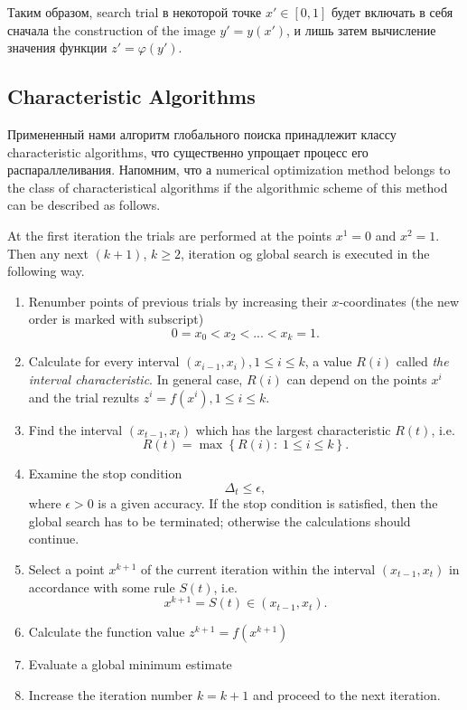 \documentclass{svproc}
\begin{document}
Таким образом, search trial в некоторой точке $x'\in[0,1]$ будет включать в себя сначала the construction of the image $y'=y(x')$, и лишь затем вычисление значения функции $ z' = \varphi(y')$.

\subsection{Characteristic Algorithms}

Примененный нами алгоритм глобального поиска принадлежит классу characteristic algorithms, что существенно упрощает процесс его распараллеливания.
Напомним, что а numerical optimization method belongs to the class of characteristical algorithms if the algorithmic scheme of this method can be described as follows.

At the first iteration the trials are performed at the points $x^1 = 0$ and $x^2 = 1$. Then any next $(k+1)$, $k \geq 2$, iteration og global search is executed in the following way.

\begin{enumerate}
	\item 
Renumber points of previous trials by increasing their $x$-coordinates (the new order is marked with subscript)
\[
0=x_0<x_2<...<x_{k}=1.
\]

	\item 
Calculate for every interval $(x_{i-1},x_i), 1\leq i\leq k$, a value $R(i)$ called \textit{the interval characteristic}. In general case, $R(i)$ can depend on the points $x^i$ and the trial rezults $z^i=f(x^i), 1 \leq i \leq k$.

	\item 
Find the interval $(x_{t-1},x_t)$ which has the largest characteristic $R(t)$, i.e.
\[
R(t) = \max \left\{ R(i): \; 1\leq i\leq k \right\}.
\]

	\item 
Examine the stop condition
\[
\Delta_t \leq \epsilon ,
\]
where $\epsilon>0$ is a given accuracy. If the stop condition is satisfied, then the global search has to be terminated; otherwise the calculations should continue.

	\item 
Select a point $x^{k+1}$ of the current iteration within the interval $(x_{t-1},x_t)$ in accordance with some rule $S(t)$, i.e.
\[
x^{k+1} = S(t)\in(x_{t-1},x_t).
\]
	
	\item 
Calculate the function value $z^{k+1} = f(x^{k+1})$

	\item 
Evaluate a global minimum estimate 

	\item 
Increase the iteration number $k=k+1$ and proceed to the next iteration.
\end{enumerate}
\end{document}
